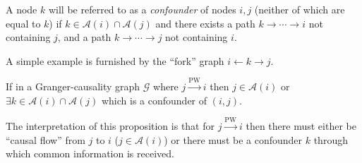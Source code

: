 \documentclass[12pt]{article}
\def\pwgc{\overset{\text{PW}}{\rightarrow}}  %
\def\gcg{\mathcal{G}}  %
\newcommand{\anc}[1]{\mathcal{A}(#1)}  %
\newcommand{\gcgpath}[2]{#1 \rightarrow \cdots \rightarrow #2}  %
\begin{document}
\begin{definition}[Confounder]
  A node $k$ will be referred to as a \textit{confounder} of nodes
  $i, j$ (neither of which are equal to $k$) if
  $k \in \anc{i} \cap \anc{j}$ and there exists a path
  $\gcgpath{k}{i}$ not containing $j$, and a path $\gcgpath{k}{j}$
  not containing $i$.

  A simple example is furnished by the ``fork'' graph
  $i \leftarrow k \rightarrow j$.
\end{definition}

\begin{proposition}
  \label{prop:ancestor_properties}
  If in a Granger-causality graph $\gcg$ where $j \pwgc i$ then
  $j \in \anc{i}$ or $\exists k \in \anc{i} \cap\anc{j}$ which is a
  confounder of $(i, j)$.
\end{proposition}

\begin{remark}
  The interpretation of this proposition is that for $j \pwgc i$ then
  there must either be ``causal flow'' from $j$ to $i$
  ($j \in \anc{i}$) or there must be a confounder $k$ through which
  common information is received.
\end{remark}
\end{document}
